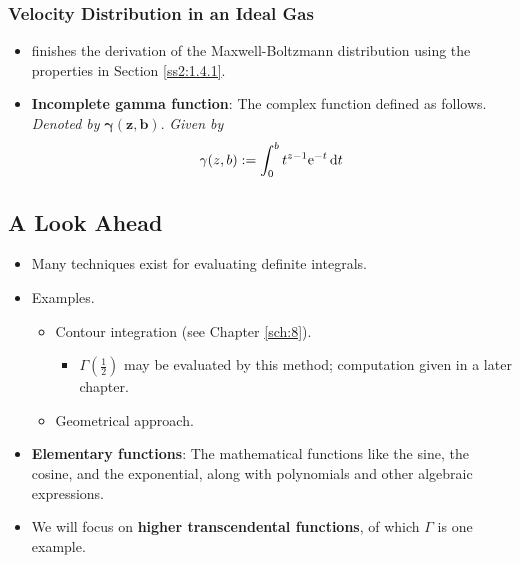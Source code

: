 \documentclass[../finalProject.tex]{subfiles}
\begin{document}
\subsubsection{Velocity Distribution in an Ideal Gas}
\begin{itemize}
    \item \textcite{bib:Seaborn} finishes the derivation of the Maxwell-Boltzmann distribution using the properties in Section \ref{ss2:1.4.1}.
    \item \textbf{Incomplete gamma function}: The complex function defined as follows. \emph{Denoted by} $\bm{\gamma(z,b)}$. \emph{Given by}
    \begin{equation*}
        \gamma(z,b) := \int_0^bt^{z-1}\e[-t]\dd{t}
    \end{equation*}
\end{itemize}


\subsection{A Look Ahead}
\begin{itemize}
    \item Many techniques exist for evaluating definite integrals.
    \item Examples.
    \begin{itemize}
        \item Contour integration (see Chapter \ref{sch:8}).
        \begin{itemize}
            \item $\Gamma(\frac{1}{2})$ may be evaluated by this method; computation given in a later chapter.
        \end{itemize}
        \item Geometrical approach.
    \end{itemize}
    \item \textbf{Elementary functions}: The mathematical functions like the sine, the cosine, and the exponential, along with polynomials and other algebraic expressions.
    \item We will focus on \textbf{higher transcendental functions}, of which $\Gamma$ is one example.
\end{itemize}
\end{document}
